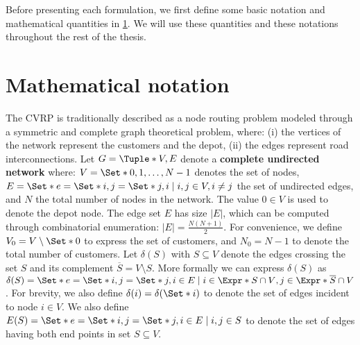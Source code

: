 Before presenting each formulation, we first define some basic notation
and mathematical quantities in \cref{sec:cvrp-mathematical-notation}.
We will use these quantities and these notations throughout the rest of the thesis.

\section{Mathematical notation}
\label{sec:cvrp-mathematical-notation}

The CVRP is traditionally described as a node routing problem
modeled through a symmetric and complete graph theoretical problem,
where: (i) the vertices of the network represent the customers and the depot,
(ii) the edges represent road interconnections.
Let $G = \Tuple*{V, E}$ denote a \textbf{complete undirected network} where:
$V = \Set*{0, 1, \dots, N - 1}$ denotes the set of nodes,
$E = \Set*{e = \Set*{i, j} = \Set*{j, i} \mid \allowbreak i,j \in V, \allowbreak i \ne j}$  the set of undirected edges,
and $N$ the total number of nodes in the network.
The value $0 \in V$ is used to denote the depot node.
The edge set $E$ has size $|E|$, which can be computed through combinatorial enumeration: $|E| = \frac{N (N+1)}{2}$.
For convenience, we define $V_0 = V \setminus \Set*{0}$ to express the set of customers,
and $N_0 = N - 1$ to denote the total number of customers.
Let $\delta(S)$ with $S \subseteq V$ denote
the edges crossing the set $S$ and its complement $\overline{S} = V \setminus S$.
More formally we can express $\delta(S)$ as
$\delta(S) = \Set*{ e = \Set*{i, j} = \Set*{j, i} \in E \mid i \in \Expr*{S \cap V}, j \in \Expr*{ \overline{S} \cap V } }$.
For brevity, we also define $\delta(i) = \delta(\Set*{i})$ to denote the set of edges incident to node $i \in V$.
We also define $E(S) = \Set*{e = \Set*{i, j} = \Set*{j, i}\in E \mid i, j \in S}$
to denote the set of edges having both end points in set $S \subseteq V$.

